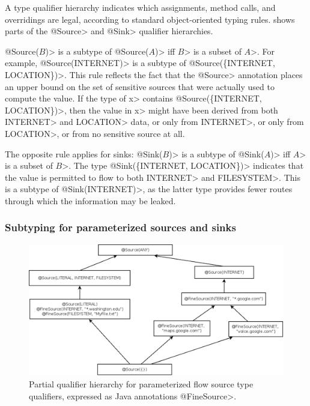 A type qualifier hierarchy indicates
which assignments, method calls, and overridings are legal, according to
standard object-oriented typing rules.
 shows parts of the \<@Source> and
\<@Sink> qualifier hierarchies.


\<@Source($B$)> is a subtype of \<@Source($A$)> iff \<$B$> is a subset of \<$A$>.
For example, \<@Source(INTERNET)> is a subtype of \<@Source(\{INTERNET, LOCATION\})>.
This rule reflects the fact that the \<@Source> annotation
places an upper bound on the set of sensitive sources that were actually
used to compute the value.
If the type of \<x> contains \<@Source(\{INTERNET, LOCATION\})>, then the value
in \<x> might have been derived from both \<INTERNET> and \<LOCATION> data, or
only from \<INTERNET>, or only from \<LOCATION>, or from no
sensitive source at all.

The opposite rule applies for sinks:
\<@Sink($B$)> is a subtype of \<@Sink($A$)> iff \<$A$> is a subset of \<$B$>.
The type \<@Sink(\{INTERNET, LOCATION\})> indicates that
the value is permitted to flow to both \<INTERNET> and \<FILESYSTEM>.  This
is a subtype of \<@Sink(INTERNET)>, as the latter type provides fewer routes through which the information may be
leaked.

\subsubsection{Subtyping for parameterized sources and sinks\label{sec:param-subtyping}}

\begin{figure}
\centerline{\includegraphics[width=1.0\textwidth]{figures/flowsources_parameterized}}
\caption{Partial qualifier hierarchy for parameterized flow source type
  qualifiers, expressed as Java annotations \<@FineSource>.}
\label{fig:flow-hierarchy-parameterized-source}
\end{figure}

